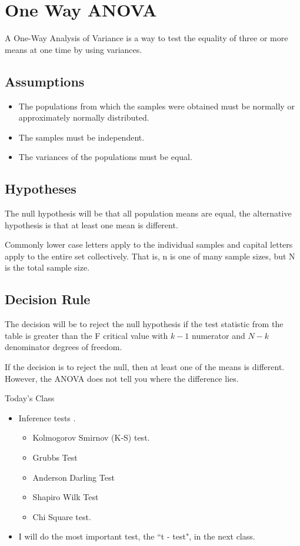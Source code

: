 \documentclass[a4paper,12pt]{article}
\begin{document}
\section{One Way ANOVA}

A One-Way Analysis of Variance is a way to test the equality of three or more means at one time by using variances.

\subsection{Assumptions}
\begin{itemize}\item The populations from which the samples were obtained must be normally or approximately normally distributed.
\item The samples must be independent.
\item The variances of the populations must be equal.
\end{itemize}
\subsection{Hypotheses}
The null hypothesis will be that all population means are equal, the alternative hypothesis is that at least one mean is different.

 Commonly lower case letters apply to the individual samples and capital letters apply to the entire set collectively. That is, n is one of many sample sizes, but N is the total sample size.

\subsection{Decision Rule}
The decision will be to reject the null hypothesis if the test statistic from the table is greater than the F critical value with $k-1$ numerator and $N-k$ denominator degrees of freedom.

If the decision is to reject the null, then at least one of the means is different. However, the ANOVA does not tell you where the difference lies.


\newpage



\newpage

{Today's Class}

\begin{itemize}
	\item Inference tests .
	\begin{itemize}
		\item Kolmogorov Smirnov (K-S) test.
		\item Grubbs Test
		\item Anderson Darling Test
		\item Shapiro Wilk Test
		\item Chi Square test.
	\end{itemize}
	\item I will do the most important test, the ``t - test", in the next class.
\end{itemize}
\end{document}
